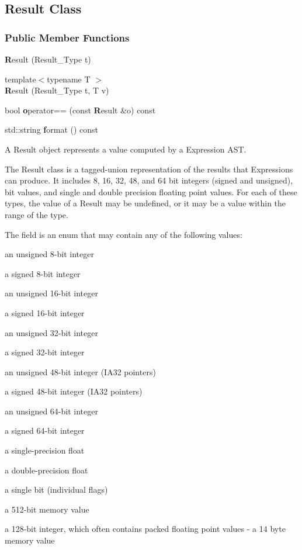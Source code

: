 \subsection{Result Class}
\label{sec:result}

\label{classDyninst_1_1InstructionAPI_1_1Result}
\subsubsection*{Public Member Functions}
\begin{DoxyCompactItemize}
\item 
{\textbf Result} (Result\_\-Type t)
\item 
{\footnotesize template$<$typename T $>$ }\\{\textbf Result} (Result\_\-Type t, T v)
\item 
bool {\textbf operator==} (const {\textbf Result} \&o) const 
\item 
std::string {\textbf format} () const 
\end{DoxyCompactItemize}



A Result object represents a value computed by a Expression AST.

The Result class is a tagged-\/union representation of the results that Expressions can produce. It includes 8, 16, 32, 48, and 64 bit integers (signed and unsigned), bit values, and single and double precision floating point values. For each of these types, the value of a Result may be undefined, or it may be a value within the range of the type.

The  field is an enum that may contain any of the following values:
\begin{DoxyItemize}
\item {} an unsigned 8-\/bit integer
\item {} a signed 8-\/bit integer
\item {} an unsigned 16-\/bit integer
\item {} a signed 16-\/bit integer
\item {} an unsigned 32-\/bit integer
\item {} a signed 32-\/bit integer
\item {} an unsigned 48-\/bit integer (IA32 pointers)
\item {} a signed 48-\/bit integer (IA32 pointers)
\item {} an unsigned 64-\/bit integer
\item {} a signed 64-\/bit integer
\item {} a single-\/precision float
\item {} a double-\/precision float
\item {} a single bit (individual flags)
\item {} a 512-\/bit memory value
\item {} a 128-\/bit integer, which often contains packed floating point values -\/  a 14 byte memory value 
\end{DoxyItemize}

